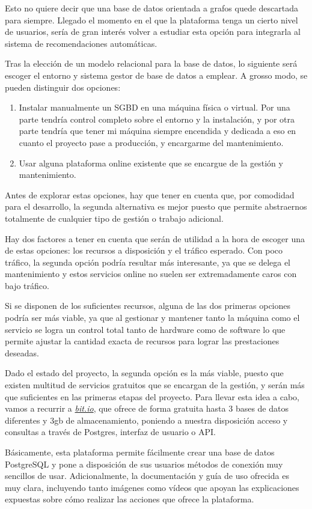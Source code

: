 Esto no quiere decir que una base de datos orientada a grafos quede descartada para siempre. Llegado el momento en el que la plataforma tenga un cierto nivel de usuarios, sería de gran interés volver a estudiar esta opción para integrarla al sistema de recomendaciones automáticas.

Tras la elección de un modelo relacional para la base de datos, lo siguiente será escoger el entorno y sistema gestor de base de datos a emplear. A grosso modo, se pueden distinguir dos opciones:

\begin{enumerate}
    \item Instalar manualmente un SGBD en una máquina física o virtual. Por una parte tendría control completo sobre el entorno y la instalación, y por otra parte tendría que tener mi máquina siempre encendida y dedicada a eso en cuanto el proyecto pase a producción, y encargarme del mantenimiento.
    \item Usar alguna plataforma online existente que se encargue de la gestión y mantenimiento.
\end{enumerate}

Antes de explorar estas opciones, hay que tener en cuenta que, por comodidad para el desarrollo, la segunda alternativa es mejor puesto que permite abstraernos totalmente de cualquier tipo de gestión o trabajo adicional.

Hay dos factores a tener en cuenta que serán de utilidad a la hora de escoger una de estas opciones: los recursos a disposición y el tráfico esperado. Con poco tráfico, la segunda opción podría resultar más interesante, ya que se delega el mantenimiento y estos servicios online no suelen ser extremadamente caros con bajo tráfico.

Si se disponen de los suficientes recursos, alguna de las dos primeras opciones podría ser más viable, ya que al gestionar y mantener tanto la máquina como el servicio se logra un control total tanto de hardware como de software lo que permite ajustar la cantidad exacta de recursos para lograr las prestaciones deseadas.

Dado el estado del proyecto, la segunda opción es la más viable, puesto que existen multitud de servicios gratuitos que se encargan de la gestión, y serán más que suficientes en las primeras etapas del proyecto. Para llevar esta idea a cabo, vamos a recurrir a \href{https://bit.io/}{\textit{bit.io}}, que ofrece de forma gratuita hasta 3 bases de datos diferentes y 3gb de almacenamiento, poniendo a nuestra disposición acceso y consultas a través de Postgres, interfaz de usuario o API.

Básicamente, esta plataforma permite fácilmente crear una base de datos PostgreSQL y pone a disposición de sus usuarios métodos de conexión muy sencillos de usar. Adicionalmente, la documentación y guía de uso ofrecida es muy clara, incluyendo tanto imágenes como vídeos que apoyan las explicaciones expuestas sobre cómo realizar las acciones que ofrece la plataforma.